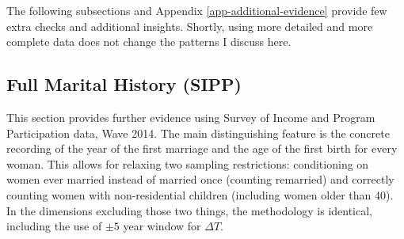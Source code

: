 \documentclass[12pt,letter]{article}
\begin{document}
The following subsections and Appendix \ref{app-additional-evidence} provide few extra checks and additional insights. Shortly, using more detailed and more complete data does not change the patterns I discuss here. 

\subsection{Full Marital History (SIPP) \label{sipp-results}}
This section provides further evidence using Survey of Income and Program Participation data, Wave 2014. The main distinguishing feature is the concrete recording of the year of the first marriage and the age of the first birth for every woman. This allows for relaxing two sampling restrictions: conditioning on women ever married instead of married once (counting remarried) and correctly counting women with non-residential children (including women older than 40). In the dimensions excluding those two things, the methodology is identical, including the use of $\pm 5$ year window for $\Delta T$.
\end{document}
